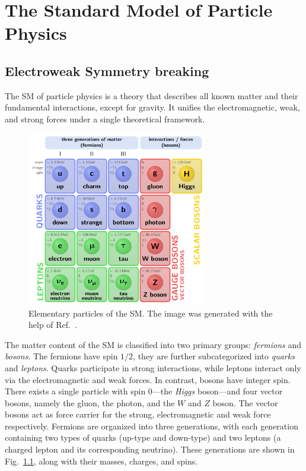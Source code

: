 
\chapter{The Standard Model of Particle Physics}\label{chap:two}

\section{Electroweak Symmetry breaking} \label{sec:2:EW_symmetry_breaking}
The \acs{SM} of particle physics is a theory that describes all known matter and their fundamental interactions, except for gravity. It unifies the electromagnetic, weak, and strong forces under a single theoretical framework.
\begin{figure}
\centering
\includegraphics[width=0.7\textwidth]{Images/SM.pdf}
\caption{Elementary particles of the \acs{SM}. The image was generated with the help of Ref.~\cite{Neutelings_2024}.}
\label{fig:2:SM}
\end{figure}
The matter content of the \acs{SM} is classified into two primary groups: \textit{fermions} and \textit{bosons}. The fermions have spin $1/2$, they are further subcategorized into \textit{quarks} and \textit{leptons}. Quarks participate in strong interactions, while leptons interact only via the electromagnetic and weak forces. In contrast, bosons have integer spin. There exists a single particle with spin 0---the \textit{Higgs} boson---and four vector bosons, namely the gluon, the photon, and the $W$ and $Z$ boson. The vector bosons act as force carrier for the strong, electromagnetic and weak force respectively. Fermions are organized into three generations, with each generation containing two types of quarks (up-type and down-type) and two leptons (a charged lepton and its corresponding neutrino). These generations are shown in Fig.~\ref{fig:2:SM}, along with their masses, charges, and spins.

